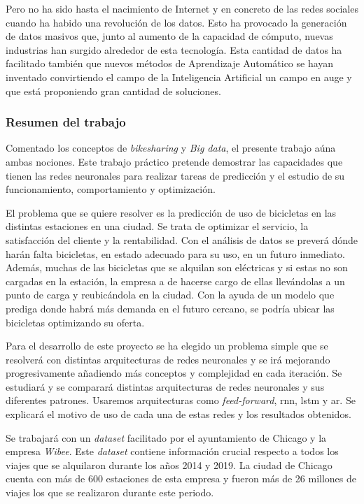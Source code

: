 Pero no ha sido hasta el nacimiento de Internet y en concreto de las redes sociales cuando ha habido una revolución de los datos. Esto ha provocado la generación de datos masivos que, junto al aumento de la capacidad de cómputo, nuevas industrias han surgido alrededor de esta tecnología. Esta cantidad de datos ha facilitado también que nuevos métodos de Aprendizaje Automático se hayan inventado convirtiendo el campo de la Inteligencia Artificial un campo en auge y que está proponiendo gran cantidad de soluciones.
\newline

\subsubsection{Resumen del trabajo}
Comentado los conceptos de \textit{bikesharing} y \textit{Big data}, el presente trabajo aúna ambas nociones. Este trabajo práctico pretende demostrar las capacidades que tienen las redes neuronales para realizar tareas de predicción y el estudio de su funcionamiento, comportamiento y optimización.
\newline

El problema que se quiere resolver es la predicción de uso de bicicletas en las distintas estaciones en una ciudad. Se trata de optimizar el servicio, la satisfacción del cliente y la rentabilidad. Con el análisis de datos se preverá dónde harán falta bicicletas, en estado adecuado para su uso, en un futuro inmediato. Además, muchas de las bicicletas que se alquilan son eléctricas y si estas no son cargadas en la estación, la empresa a de hacerse cargo de ellas llevándolas a un punto de carga y reubicándola en la ciudad. Con la ayuda de un modelo que prediga donde habrá más demanda en el futuro cercano, se podría ubicar las bicicletas optimizando su oferta.
\newline

Para el desarrollo de este proyecto se ha elegido un problema simple que se resolverá con distintas arquitecturas de redes neuronales y se irá mejorando progresivamente añadiendo más conceptos y complejidad en cada iteración. Se estudiará y se comparará distintas arquitecturas de redes neuronales y sus diferentes patrones. Usaremos arquitecturas como \textit{feed-forward}, \acrfull{rnn}, \acrfull{lstm} y \acrfull{ar}. Se explicará el motivo de uso de cada una de estas redes y los resultados obtenidos.
\newline

Se trabajará con un \textit{dataset} facilitado por el ayuntamiento de Chicago y la empresa \textit{Wibee}. Este \textit{dataset} contiene información crucial respecto a todos los viajes que se alquilaron durante los años 2014 y 2019. La ciudad de Chicago cuenta con más de 600 estaciones de esta empresa y fueron más de 26 millones de viajes los que se realizaron durante este periodo.
\newline


